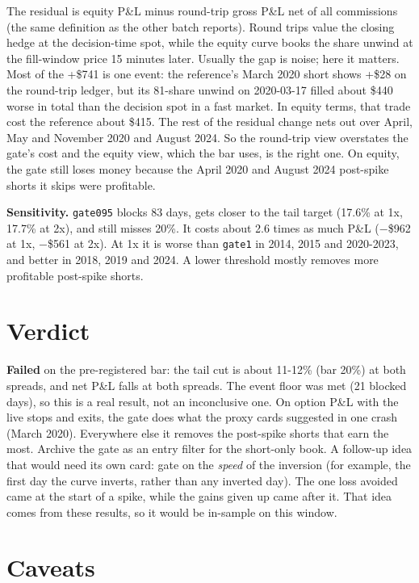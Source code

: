 \documentclass{article}
\begin{document}
The residual is equity P\&L minus round-trip gross P\&L net of all commissions (the same definition as the other batch reports). Round trips value the closing hedge at the decision-time spot, while the equity curve books the share unwind at the fill-window price 15 minutes later. Usually the gap is noise; here it matters. Most of the +\$741 is one event: the reference's March 2020 short shows +\$28 on the round-trip ledger, but its 81-share unwind on 2020-03-17 filled about \$440 worse in total than the decision spot in a fast market. In equity terms, that trade cost the reference about \$415. The rest of the residual change nets out over April, May and November 2020 and August 2024. So the round-trip view overstates the gate's cost and the equity view, which the bar uses, is the right one. On equity, the gate still loses money because the April 2020 and August 2024 post-spike shorts it skips were profitable.

\textbf{Sensitivity.} \texttt{gate095} blocks 83 days, gets closer to the tail target (17.6\% at 1x, 17.7\% at 2x), and still misses 20\%. It costs about 2.6 times as much P\&L (\ensuremath{-}\$962 at 1x, \ensuremath{-}\$561 at 2x). At 1x it is worse than \texttt{gate1} in 2014, 2015 and 2020-2023, and better in 2018, 2019 and 2024. A lower threshold mostly removes more profitable post-spike shorts.

\section{Verdict}

\textbf{Failed} on the pre-registered bar: the tail cut is about 11-12\% (bar 20\%) at both spreads, and net P\&L falls at both spreads. The event floor was met (21 blocked days), so this is a real result, not an inconclusive one. On option P\&L with the live stops and exits, the gate does what the proxy cards suggested in one crash (March 2020). Everywhere else it removes the post-spike shorts that earn the most. Archive the gate as an entry filter for the short-only book. A follow-up idea that would need its own card: gate on the \emph{speed} of the inversion (for example, the first day the curve inverts, rather than any inverted day). The one loss avoided came at the start of a spike, while the gains given up came after it. That idea comes from these results, so it would be in-sample on this window.

\section{Caveats}
\end{document}
